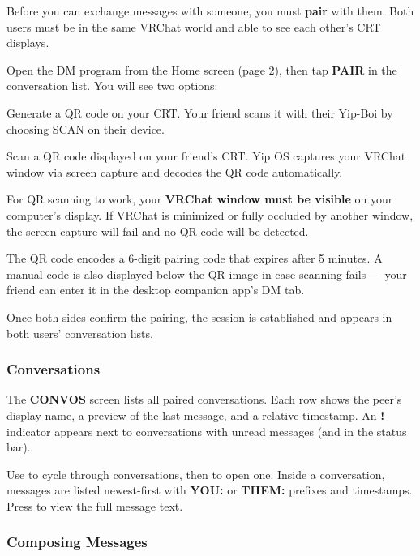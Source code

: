\documentclass[10pt]{article}
\newcommand{\key}[1]{\fbox{\texttt{\footnotesize #1}}}
\begin{document}
Before you can exchange messages with someone, you must \textbf{pair} with them. Both users must be in the same VRChat world and able to see each other's CRT displays.

Open the DM program from the Home screen (page 2), then tap \textbf{PAIR} in the conversation list. You will see two options:

\begin{description}[style=nextline, leftmargin=1em, font=\bfseries\ttfamily, nosep]
  \item[DIAL] Generate a QR code on your CRT. Your friend scans it with their Yip-Boi by choosing SCAN on their device.
  \item[SCAN] Scan a QR code displayed on your friend's CRT. Yip OS captures your VRChat window via screen capture and decodes the QR code automatically.
\end{description}

\begin{warnbox}[IMPORTANT]
  For QR scanning to work, your \textbf{VRChat window must be visible} on your computer's display. If VRChat is minimized or fully occluded by another window, the screen capture will fail and no QR code will be detected.
\end{warnbox}

\noindent The QR code encodes a 6-digit pairing code that expires after 5 minutes. A manual code is also displayed below the QR image in case scanning fails --- your friend can enter it in the desktop companion app's DM tab.

Once both sides confirm the pairing, the session is established and appears in both users' conversation lists.

\subsubsection{Conversations}

The \textbf{CONVOS} screen lists all paired conversations. Each row shows the peer's display name, a preview of the last message, and a relative timestamp. An \textbf{!} indicator appears next to conversations with unread messages (and in the status bar).

Use \key{JOYSTICK} to cycle through conversations, then \key{SEL} to open one. Inside a conversation, messages are listed newest-first with \textbf{YOU:} or \textbf{THEM:} prefixes and timestamps. Press \key{SEL} to view the full message text.

\subsubsection{Composing Messages}
\end{document}
